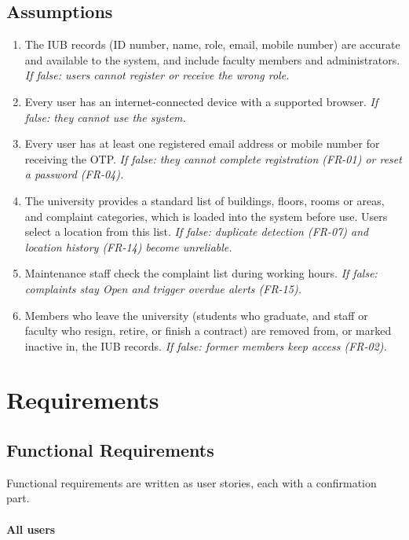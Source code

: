 \section{Assumptions}
\begin{enumerate}
  \item The IUB records (ID number, name, role, email, mobile number) are accurate and available to the system, and include faculty members and administrators. \textit{If false: users cannot register or receive the wrong role.}
  \item Every user has an internet-connected device with a supported browser. \textit{If false: they cannot use the system.}
  \item Every user has at least one registered email address or mobile number for receiving the OTP. \textit{If false: they cannot complete registration (FR-01) or reset a password (FR-04).}
  \item The university provides a standard list of buildings, floors, rooms or areas, and complaint categories, which is loaded into the system before use. Users select a location from this list. \textit{If false: duplicate detection (FR-07) and location history (FR-14) become unreliable.}
  \item Maintenance staff check the complaint list during working hours. \textit{If false: complaints stay Open and trigger overdue alerts (FR-15).}
  \item Members who leave the university (students who graduate, and staff or faculty who resign, retire, or finish a contract) are removed from, or marked inactive in, the IUB records. \textit{If false: former members keep access (FR-02).}
\end{enumerate}

\newpage



\chapter{Requirements}
\label{Requirements}

\section{Functional Requirements}
Functional requirements are written as user stories, each with a confirmation part.

\subsubsection*{All users}

